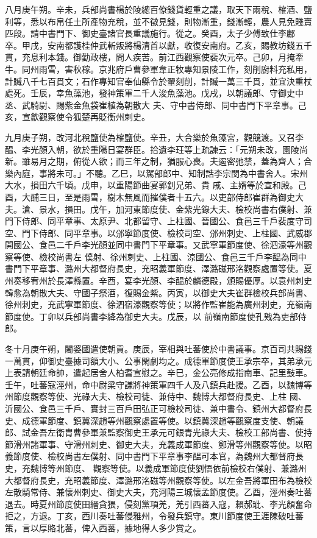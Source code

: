 \begin{pinyinscope}
 八月庚午朔。辛未，兵部尚書楊於陵總百僚錢貨輕重之議，取天下兩稅、榷酒、鹽利等，悉以布帛任土所產物充稅，並不徵見錢，則物漸重，錢漸輕，農人見免賤賣匹段。請中書門下、御史臺諸官長重議施行。從之。癸酉，太子少傅致仕李鄘
 卒。甲戌，安南都護桂仲武斬叛將楊清首以獻，收復安南府。乙亥，賜教坊錢五千貫，充息利本錢。御勤政樓，問人疾苦。前江西觀察使裴次元卒。己卯，月掩牽牛。同州雨雪，害秋稼。京兆府戶曹參軍韋正牧專知景陵工作，刻削廚料充私用，計贓八千七百貫文；石作專知官奉仙縣令於翬刻削，計贓一萬三千貫，並宜決重杖處死。壬辰，幸魚藻池，發神策軍二千人浚魚藻池。戊戌，以朝議郎、守御史中丞、武騎尉、賜紫金魚袋崔植為朝散大
 夫、守中書侍郎、同中書門下平章事。己亥，宣歙觀察使令狐楚再貶衡州刺史。



 九月庚子朔，改河北稅鹽使為榷鹽使。辛丑，大合樂於魚藻宮，觀競渡。又召李醖、李光顏入朝，欲於重陽日宴群臣。拾遺李玨等上疏諫云：「元朔未改，園陵尚新。雖易月之期，俯從人欲；而三年之制，猶服心喪。夫遏密弛禁，蓋為齊人；合樂內庭，事將未可。」不聽。乙巳，以駕部郎中、知制誥李宗閔為中書舍人。宋州大水，損田六千頃。戊申，以重陽節曲宴郭釗兄弟、貴
 戚、主婿等於宣和殿。己酉，大酺三日，至是雨雪，樹木無風而摧僕者十五六。以吏部侍郎崔群為御史大夫。滄、景水，損田。戊午，加河東節度使、金紫光錄大夫、檢校尚書右僕射、兼門下侍郎、同平章事、太原尹、北都留守、上柱國、晉國公、食邑三千戶裴度守司空、門下侍郎、同平章事。以邠寧節度使、檢校司空、邠州刺史、上柱國、武威郡開國公、食邑二千戶李光顏並同中書門下平章事。又武寧軍節度使、徐泗濠等州觀察等使、檢校尚書左
 僕射、徐州刺史、上柱國、涼國公、食邑三千戶李醖為同中書門下平章事、潞州大都督府長史，充昭義軍節度、澤潞磁邢洺觀察處置等使。夏州奏移宥州於長澤縣置。辛酉，宴李光顏、李醖於麟德殿，頒賜優厚。以袁州刺史韓愈為朝散大夫、守國子祭酒，復賜金紫。丙寅，以御史大夫崔群檢校兵部尚書、徐州刺史，充武寧軍節度、徐泗宿濠觀察等使；以將作監崔能為廣州刺史，充嶺南節度使。丁卯以兵部尚書李絳為御史大夫。戊辰，以
 前嶺南節度使孔戣為吏部侍郎。



 冬十月庚午朔，闍婆國遣使朝貢。庚辰，宰相與吐蕃使於中書議事。京百司共賜錢一萬貫，仰御史臺據司額大小、公事閑劇均之。成德軍節度使王承宗卒，其弟承元上表請朝廷命帥，遣起居舍人柏耆宣慰之。辛巳，金公亮修成指南車、記里鼓車。壬午，吐蕃寇涇州，命中尉梁守謙將神策軍四千人及八鎮兵赴援。乙酉，以魏博等州節度觀察等使、光祿大夫、檢校司徒、兼侍中、魏博大都督府長史、上柱
 國、沂國公、食邑三千戶、實封三百戶田弘正可檢校司徒、兼中書令、鎮州大都督府長史、成德軍節度、鎮冀深趙等州觀察處置等使。以鎮冀深趙等觀察度支使、朝議郎、試金吾左衛胄曹參軍兼監察御史王承元可銀青光祿大夫、檢校工部尚書、使持節滑州諸軍事、守滑州刺史、御史大夫，充義成軍節度、鄭滑等州觀察等使。以昭義節度使、檢校尚書左僕射、同中書門下平章事李醖可本官，為魏州大都督府長史，充魏博等州節度、
 觀察等使。以義成軍節度使劉悟依前檢校右僕射、兼潞州大都督府長史，充昭義節度、澤潞邢洺磁等州觀察等使。以左金吾將軍田布為檢校左散騎常侍、兼懷州刺史、御史大夫，充河陽三城懷孟節度使。乙酉，涇州奏吐蕃退去。時夏州節度使田縉貪猥，侵刻黨項羌，羌引西蕃入寇，賴郝玼、李光顏奮命拒之，方退。丁亥，西川奏吐蕃侵雅州，令發兵鎮守。東川節度使王涯陳破吐蕃策，言以厚賂北蕃，俾入西蕃，據地得人多少賞之。




\end{pinyinscope}
